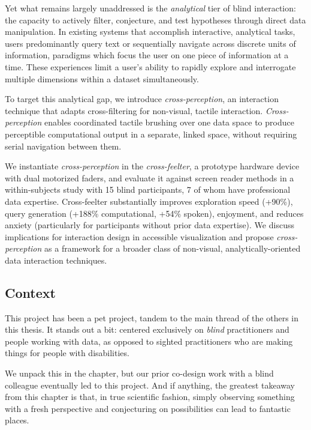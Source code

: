\documentclass[12pt]{cmuthesis}
\begin{document}
Yet what remains largely unaddressed is the \textit{analytical} tier of blind interaction: the capacity to actively filter, conjecture, and test hypotheses through direct data manipulation. In existing systems that accomplish interactive, analytical tasks, users predominantly query text or sequentially navigate across discrete units of information, paradigms which focus the user on one piece of information at a time. These experiences limit a user's ability to rapidly explore and interrogate multiple dimensions within a dataset simultaneously.

To target this analytical gap, we introduce \textit{cross-perception}, an interaction technique that adapts cross-filtering for non-visual, tactile interaction. \textit{Cross-perception} enables coordinated tactile brushing over one data space to produce perceptible computational output in a separate, linked space, without requiring serial navigation between them.

We instantiate \textit{cross-perception} in the \textit{cross-feelter}, a prototype hardware device with dual motorized faders, and evaluate it against screen reader methods in a within-subjects study with 15 blind participants, 7 of whom have professional data expertise. Cross-feelter substantially improves exploration speed (+90\%), query generation (+188\% computational, +54\% spoken), enjoyment, and reduces anxiety (particularly for participants without prior data expertise). We discuss implications for interaction design in accessible visualization and propose \textit{cross-perception} as a framework for a broader class of non-visual, analytically-oriented data interaction techniques.

\subsection{Context}

This project has been a pet project, tandem to the main thread of the others in this thesis. It stands out a bit: centered exclusively on \textit{blind} practitioners and people working with data, as opposed to sighted practitioners who are making things for people with disabilities.

We unpack this in the chapter, but our prior co-design work with a blind colleague eventually led to this project. And if anything, the greatest takeaway from this chapter is that, in true scientific fashion, simply observing something with a fresh perspective and conjecturing on possibilities can lead to fantastic places.
\end{document}
